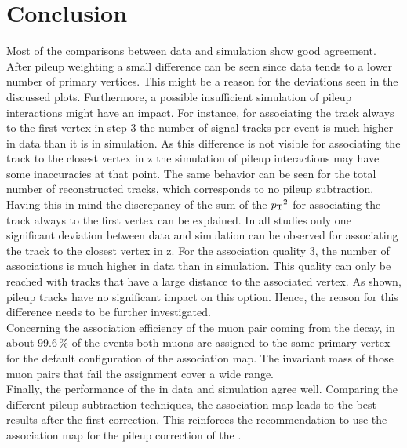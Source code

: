 \section{Conclusion}

Most of the comparisons between data and simulation show good agreement. After pileup weighting a small difference can be seen since data tends to a lower number of primary vertices. This might be a reason for the deviations seen in the discussed plots. Furthermore, a possible insufficient simulation of pileup interactions might have an impact. For instance, for associating the track always to the first vertex in step 3 the number of signal tracks per event is much higher in data than it is in simulation. As this difference is not visible for associating the track to the closest vertex in z the simulation of pileup interactions may have some inaccuracies at that point. The same behavior can be seen for the total number of reconstructed tracks, which corresponds to no pileup subtraction.\\
Having this in mind the discrepancy of the sum of the $p_{\mathrm{T}}{}^{2}$ for associating the track always to the first vertex can be explained. In all studies only one significant deviation between data and simulation can be observed for associating the track to the closest vertex in z. For the association quality 3, the number of associations is much higher in data than in simulation. This quality can only be reached with tracks that have a large distance to the associated vertex. As shown, pileup tracks have no significant impact on this option. Hence, the reason for this difference needs to be further investigated.\\
Concerning the association efficiency of the muon pair coming from the \Zz decay, in about $99.6\,\%$ of the events both muons are assigned to the same primary vertex for the default configuration of the association map. The invariant mass of those muon pairs that fail the assignment cover a wide range. \\
Finally, the performance of the \MET{} in data and simulation agree well. Comparing the different pileup subtraction techniques, the association map leads to the best results after the first correction. This reinforces the recommendation to use the association map for the pileup correction of the \MET{}.
